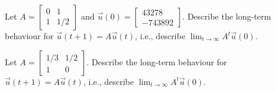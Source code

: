 \documentclass[../main.tex]{subfiles}
\begin{document}
\clearpage

\begin{example}
  Let \(A = \begin{bmatrix} 0 & 1 \\ 1 & 1/2 \end{bmatrix}\) and \(\vec{u}(0) = \begin{bmatrix} 43278 \\ - 743892\end{bmatrix}\).  Describe the long-term behaviour for \(\vec{u}(t + 1) = A \vec{u}(t)\), i.e., describe \(\lim_{t \to \infty} A^{t} \vec{u}(0)\).

\end{example}

\begin{example}
  Let \(A = \begin{bmatrix} 1/3 & 1/2 \\ 1 & 0 \end{bmatrix}\).  Describe the long-term behaviour for \(\vec{u}(t + 1) = A \vec{u}(t)\), i.e., describe \(\lim_{t \to \infty} A^{t} \vec{u}(0)\).
  
\end{example}
\end{document}
